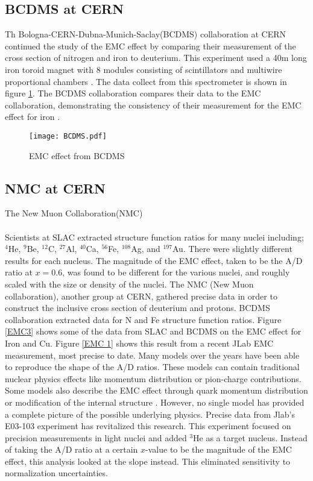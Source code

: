 \subsection{BCDMS at CERN}
Th Bologna-CERN-Dubna-Munich-Saclay(BCDMS) collaboration at CERN continued the study of the EMC effect by comparing their measurement of the cross section of nitrogen and iron to deuterium. This experiment used a 40m long iron toroid magnet with 8 modules consisting of scintillators and multiwire proportional chambers \cite{BCDMS}. The data collect from this spectrometer is shown in figure \ref{fig:BCDMS}. The BCDMS collaboration compares their data to the EMC collaboration, demonstrating the consistency of their measurement for the EMC effect for iron \cite{BCDMS,Norton}. 

\begin{figure}[h]
	\centering
	\caption{EMC effect from BCDMS \cite{BCDMS}}
	\label{fig:BCDMS}
	\centering
	\texttt{[image: BCDMS.pdf]}
\end{figure}
\subsection{NMC at CERN}
The New Muon Collaboration(NMC)
\paragraph{}
Scientists at SLAC extracted structure function ratios for many nuclei including; $^4$He, $^9$Be, $^{12}$C, $^{27}$Al, $^{40}$Ca, $^{56}$Fe, $^{108}$Ag, and $^{197}$Au. There were slightly different results for each nucleus. The magnitude of the EMC effect, taken to be the A/D ratio at $x=0.6$, was found to be different for the various nuclei, and roughly scaled with the size or density of the nuclei. The NMC (New Muon collaboration), another group at CERN, gathered precise data in order to construct the inclusive cross section of deuterium and protons. BCDMS collaboration extracted data for N and Fe structure function ratios. Figure \ref{EMC3} shows some of the data from SLAC and BCDMS on the EMC effect for Iron and Cu. Figure \ref{EMC 1} shows this result from a recent JLab EMC measurement, most precise to date. Many models over the years have been able to reproduce the shape of the A/D ratios. These models can contain traditional nuclear physics effects like momentum distribution or pion-charge contributions. Some models also describe the EMC effect through quark momentum distribution or modification of the internal structure \cite{Norton, piler, arri, DF, gomez}. However, no single model has provided a complete picture of the possible underlying physics. Precise data from Jlab's E03-103 experiment has revitalized this research. This experiment focused on precision measurements in light nuclei and added $^{3}$He as a target nucleus. Instead of taking the A/D ratio at a certain $x$-value to be the magnitude of the EMC effect, this analysis looked at the slope instead. This eliminated sensitivity to normalization uncertainties.

